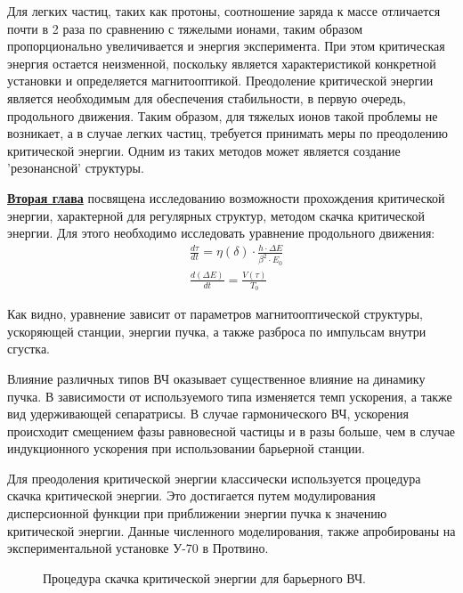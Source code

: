 \par Для легких частиц, таких как протоны, соотношение заряда к массе отличается почти в 2 раза по сравнению с тяжелыми ионами, таким образом пропорционально увеличивается и энергия эксперимента. При этом критическая энергия остается неизменной, поскольку является характеристикой конкретной установки и определяется магнитооптикой. Преодоление критической энергии является необходимым для обеспечения стабильности, в первую очередь, продольного движения. Таким образом, для тяжелых ионов такой проблемы не возникает, а в случае легких частиц, требуется принимать меры по преодолению критической энергии. Одним из таких методов может является создание 'резонансной' структуры. 

\underline{\textbf{Вторая глава}} посвящена исследованию возможности прохождения критической энергии, характерной для регулярных структур, методом скачка критической энергии. Для этого необходимо исследовать уравнение продольного движения:
\begin{equation}
\begin{aligned}
& \frac{d \tau}{d t}=\eta(\delta) \cdot \frac{h \cdot \Delta E}{\beta^2 \cdot E_0} \\
& \frac{d(\Delta E)}{d t}=\frac{V(\tau)}{T_0}
\end{aligned}
\label{long}
\end{equation}

\noindent Как видно, уравнение зависит от параметров магнитооптической структуры, ускоряющей станции, энергии пучка, а также разброса по импульсам внутри сгустка.

\par Влияние различных типов ВЧ оказывает существенное влияние на динамику пучка. В зависимости от используемого типа изменяется темп ускорения, а также вид удерживающей сепаратрисы. В случае гармонического ВЧ, ускорения происходит смещением фазы равновесной частицы и в разы больше, чем в случае индукционного ускорения при использовании барьерной станции.

\par Для преодоления критической энергии классически используется процедура скачка критической энергии. Это достигается путем модулирования дисперсионной функции при приближении энергии пучка к значению критической энергии. Данные численного моделирования, также апробированы на экспериментальной установке У-70 в Протвино.

\begin{figure}[h]
    \caption{Процедура скачка критической энергии для барьерного ВЧ.}\label{fig:latex}
\end{figure}

